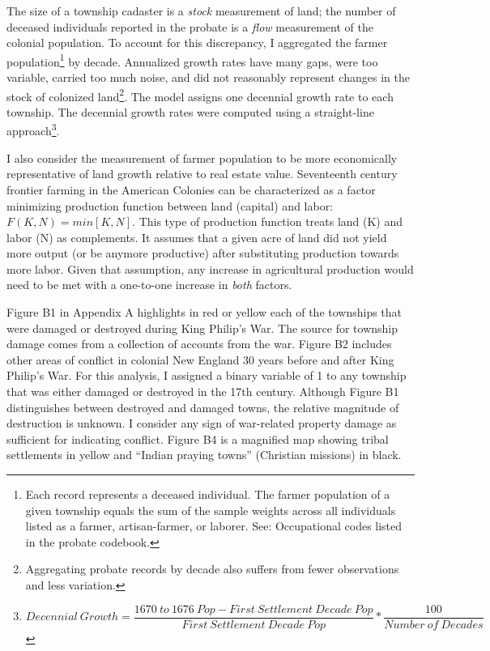 \documentclass[sn-mathphys]{sn-jnl}%
\theoremstyle{thmstyleone}%
\theoremstyle{thmstyletwo}%
\theoremstyle{thmstylethree}%
\begin{document}
The size of a township cadaster is a {\em stock} measurement of land; the number of deceased individuals reported in the probate is a {\em flow} measurement of the colonial population. %
To account for this discrepancy, I aggregated the farmer population\footnote{Each record represents a deceased individual. The farmer population of a given township equals the sum of the sample weights across all individuals listed as a farmer, artisan-farmer, or laborer. See: Occupational codes listed in the probate codebook.} by decade.
Annualized growth rates have many gaps, were too variable, carried too much noise, and did not reasonably represent changes in the stock of colonized land\footnote{Aggregating probate records by decade also suffers from fewer observations and less variation.}. The model assigns one decennial growth rate to each township. The decennial growth rates were computed using a straight-line approach\footnote{
\begin{equation}
Decennial \ Growth=
\frac{ 1670 \ to \ 1676 \ Pop - First \ Settlement \ Decade \ Pop }{First \ Settlement \ Decade \ Pop} *
\frac{100}{Number \ of \ Decades}
\end{equation}}.

I also consider the measurement of farmer population to be more economically representative of land growth relative to real estate value. Seventeenth century frontier farming in the American Colonies can be characterized as a factor minimizing production function between land (capital) and labor: $F(K,N)=min[K,N]$. This type of production function treats land (K) and labor (N) as complements. It assumes that a given acre of land did not yield more output (or be anymore productive) after substituting production towards more labor. Given that assumption, any increase in agricultural production would need to be met with a one-to-one increase in {\em both} factors. 

Figure B1 in Appendix A highlights in red or yellow each of the townships that were damaged or destroyed during King Philip's War. The source for township damage comes from a collection of accounts from the war. Figure B2 includes other areas of conflict in colonial New England 30 years before and after King Philip's War. For this analysis, I assigned a binary variable of 1 to any township that was either damaged or destroyed in the 17th century. Although Figure B1 distinguishes between destroyed and damaged towns, the relative magnitude of destruction is unknown. I consider any sign of war-related property damage as sufficient for indicating conflict. Figure B4 is a magnified map showing tribal settlements in yellow and ``Indian praying towns'' (Christian missions) in black. 
\end{document}
